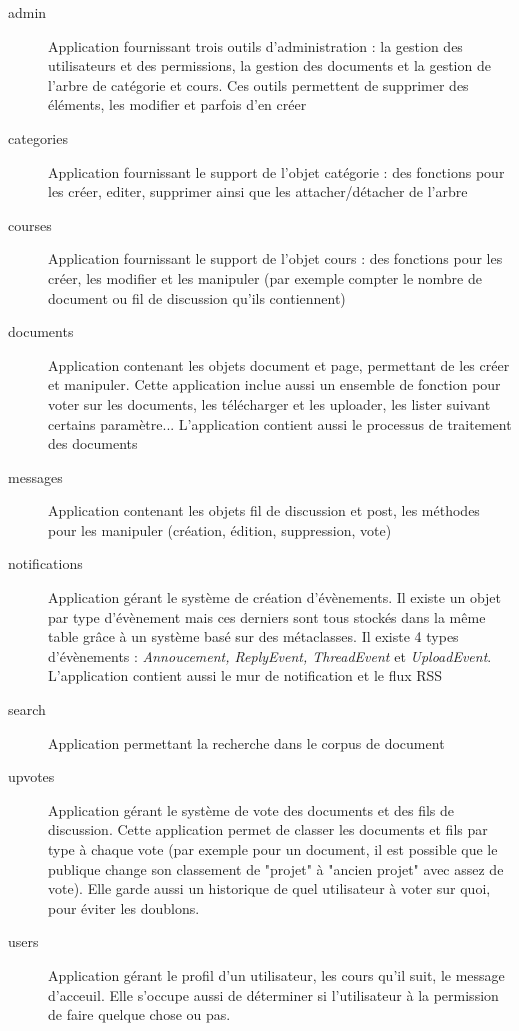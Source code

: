 \documentclass[a4paper,12pt]{article}
\begin{document}
\begin{description}
\item[admin] Application fournissant trois outils d'administration : la gestion
   des utilisateurs et des permissions, la gestion des documents et la gestion
   de l'arbre de catégorie et cours. Ces outils permettent de supprimer des éléments,
   les modifier et parfois d'en créer
\item[categories] Application fournissant le support de l'objet catégorie :
   des fonctions pour les créer, editer, supprimer ainsi que les attacher/détacher de l'arbre
\item[courses] Application fournissant le support de l'objet cours :
   des fonctions pour les créer, les modifier et les manipuler (par exemple compter le nombre
   de document ou fil de discussion qu'ils contiennent)
\item[documents] Application contenant les objets document et page, permettant de les
   créer et manipuler. Cette application inclue aussi un ensemble de fonction pour
   voter sur les documents, les télécharger et les uploader, les lister suivant certains
   paramètre... L'application contient aussi le processus de traitement des documents
\item[messages] Application contenant les objets fil de discussion et post, les méthodes
   pour les manipuler (création, édition, suppression, vote)
\item[notifications] Application gérant le système de création d'évènements. Il existe
   un objet par type d'évènement mais ces derniers sont tous stockés dans la même
   table grâce à un système basé sur des métaclasses. Il existe 4 types d'évènements :
   \textit{Annoucement, ReplyEvent, ThreadEvent} et \textit{UploadEvent}. L'application
   contient aussi le mur de notification et le flux RSS
\item[search] Application permettant la recherche dans le corpus de document
\item[upvotes] Application gérant le système de vote des documents et des fils de discussion.
   Cette application permet de classer les documents et fils par type à chaque vote
   (par exemple pour un document, il est possible que le publique change son classement
   de "projet" à "ancien projet" avec assez de vote). Elle garde aussi un historique
   de quel utilisateur à voter sur quoi, pour éviter les doublons.
\item[users] Application gérant le profil d'un utilisateur, les cours qu'il suit, le
   message d'acceuil. Elle s'occupe aussi de déterminer si l'utilisateur à la permission
   de faire quelque chose ou pas.
\end{description}
\end{document}
